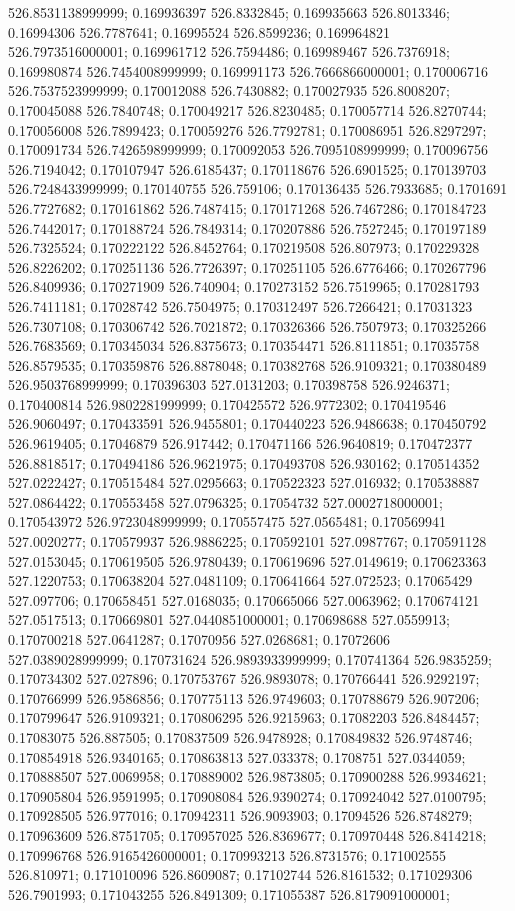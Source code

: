 526.8531138999999; 0.169936397 526.8332845; 0.169935663 526.8013346; 0.16994306 526.7787641; 0.16995524 526.8599236; 0.169964821 526.7973516000001; 0.169961712 526.7594486; 0.169989467 526.7376918; 0.169980874 526.7454008999999; 0.169991173 526.7666866000001; 0.170006716 526.7537523999999; 0.170012088 526.7430882; 0.170027935 526.8008207; 0.170045088 526.7840748; 0.170049217 526.8230485; 0.170057714 526.8270744; 0.170056008 526.7899423; 0.170059276 526.7792781; 0.170086951 526.8297297; 0.170091734 526.7426598999999; 0.170092053 526.7095108999999; 0.170096756 526.7194042; 0.170107947 526.6185437; 0.170118676 526.6901525; 0.170139703 526.7248433999999; 0.170140755 526.759106; 0.170136435 526.7933685; 0.1701691 526.7727682; 0.170161862 526.7487415; 0.170171268 526.7467286; 0.170184723 526.7442017; 0.170188724 526.7849314; 0.170207886 526.7527245; 0.170197189 526.7325524; 0.170222122 526.8452764; 0.170219508 526.807973; 0.170229328 526.8226202; 0.170251136 526.7726397; 0.170251105 526.6776466; 0.170267796 526.8409936; 0.170271909 526.740904; 0.170273152 526.7519965; 0.170281793 526.7411181; 0.17028742 526.7504975; 0.170312497 526.7266421; 0.17031323 526.7307108; 0.170306742 526.7021872; 0.170326366 526.7507973; 0.170325266 526.7683569; 0.170345034 526.8375673; 0.170354471 526.8111851; 0.17035758 526.8579535; 0.170359876 526.8878048; 0.170382768 526.9109321; 0.170380489 526.9503768999999; 0.170396303 527.0131203; 0.170398758 526.9246371; 0.170400814 526.9802281999999; 0.170425572 526.9772302; 0.170419546 526.9060497; 0.170433591 526.9455801; 0.170440223 526.9486638; 0.170450792 526.9619405; 0.17046879 526.917442; 0.170471166 526.9640819; 0.170472377 526.8818517; 0.170494186 526.9621975; 0.170493708 526.930162; 0.170514352 527.0222427; 0.170515484 527.0295663; 0.170522323 527.016932; 0.170538887 527.0864422; 0.170553458 527.0796325; 0.17054732 527.0002718000001; 0.170543972 526.9723048999999; 0.170557475 527.0565481; 0.170569941 527.0020277; 0.170579937 526.9886225; 0.170592101 527.0987767; 0.170591128 527.0153045; 0.170619505 526.9780439; 0.170619696 527.0149619; 0.170623363 527.1220753; 0.170638204 527.0481109; 0.170641664 527.072523; 0.17065429 527.097706; 0.170658451 527.0168035; 0.170665066 527.0063962; 0.170674121 527.0517513; 0.170669801 527.0440851000001; 0.170698688 527.0559913; 0.170700218 527.0641287; 0.17070956 527.0268681; 0.17072606 527.0389028999999; 0.170731624 526.9893933999999; 0.170741364 526.9835259; 0.170734302 527.027896; 0.170753767 526.9893078; 0.170766441 526.9292197; 0.170766999 526.9586856; 0.170775113 526.9749603; 0.170788679 526.907206; 0.170799647 526.9109321; 0.170806295 526.9215963; 0.17082203 526.8484457; 0.17083075 526.887505; 0.170837509 526.9478928; 0.170849832 526.9748746; 0.170854918 526.9340165; 0.170863813 527.033378; 0.1708751 527.0344059; 0.170888507 527.0069958; 0.170889002 526.9873805; 0.170900288 526.9934621; 0.170905804 526.9591995; 0.170908084 526.9390274; 0.170924042 527.0100795; 0.170928505 526.977016; 0.170942311 526.9093903; 0.17094526 526.8748279; 0.170963609 526.8751705; 0.170957025 526.8369677; 0.170970448 526.8414218; 0.170996768 526.9165426000001; 0.170993213 526.8731576; 0.171002555 526.810971; 0.171010096 526.8609087; 0.17102744 526.8161532; 0.171029306 526.7901993; 0.171043255 526.8491309; 0.171055387 526.8179091000001; 